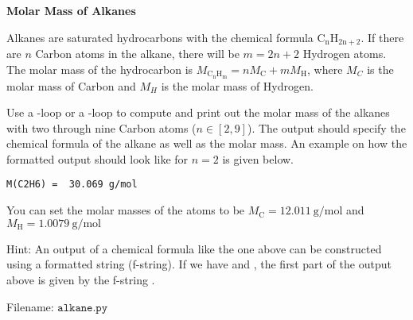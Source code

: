 \begin{Problem}{\textbf{Molar Mass of Alkanes}}

\noindent
Alkanes are saturated hydrocarbons with the chemical formula $\mathrm{C_nH_{2n+2}}$. If there are $n$ Carbon atoms in the alkane, there will be $m = 2n+2$ Hydrogen atoms. The molar mass of the hydrocarbon is $M_{\mathrm{C_n H_{m}}} = n M_{\mathrm{C}} + m M_{\mathrm{H}} $, where $M_C$ is the molar mass of Carbon and $M_H$ is the molar mass of Hydrogen.

Use a -loop or a -loop to compute and print out the molar mass of the alkanes with two through nine Carbon atoms ($n \in [2, 9]$). The output should specify the chemical formula of the alkane as well as the molar mass. An example on how the formatted output should look like for $n = 2$ is given below.
\begin{lstlisting}
M(C2H6) =  30.069 g/mol
\end{lstlisting}
You can set the molar masses of the atoms to be $M_{\mathrm{C}} = 12.011 \ \mathrm{g/mol}$ and $M_{\mathrm{H}}  = 1.0079 \ \mathrm{g/mol}$

Hint: An output of a chemical formula like the one above can be constructed using a formatted string (f-string). If we have  and
, the first part of the output above is given by the f-string .

Filename: $\texttt{alkane.py}$
\end{Problem}


